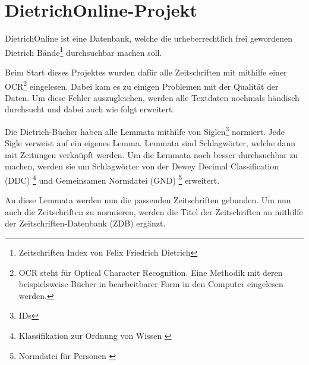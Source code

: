 \chapter{DietrichOnline-Projekt}
\label{dietrichonline}

DietrichOnline ist eine Datenbank, welche die urheberrechtlich frei gewordenen Dietrich Bände\footnote{Zeitschriften Index von Felix Friedrich Dietrich} durchsuchbar machen soll.

Beim Start dieses Projektes wurden dafür alle Zeitschriften mit mithilfe einer OCR\footnote{OCR steht für Optical Character Recognition. Eine Methodik mit deren beispielsweise Bücher in bearbeitbarer Form in den Computer eingelesen werden.} eingelesen. Dabei kam es zu einigen Problemen mit der Qualität der Daten. Um diese Fehler auszugleichen, werden alle Textdaten nochmals händisch durchsucht und dabei auch wie folgt erweitert.

Die Dietrich-Bücher haben alle Lemmata mithilfe von Siglen\footnote{IDs} normiert. Jede Sigle verweist auf ein eigenes Lemma. Lemmata sind Schlagwörter, welche dann mit Zeitungen verknüpft werden. Um die Lemmata noch besser durchsuchbar zu machen, werden sie um Schlagwörter von der Dewey Decimal Classification (DDC)  \footnote{Klassifikation zur Ordnung von Wissen \cite{DeutscheNationalBibliothek.ddc}} und Gemeinsamen Normdatei (GND)  \footnote{Normdatei für Personen \cite{DeutscheNationalBibliothek.2019b}}
erweitert.

An diese Lemmata werden nun die passenden Zeitschriften gebunden. Um nun auch die Zeitschriften zu normieren, werden die Titel der Zeitschriften an mithilfe der Zeitschriften-Datenbank (ZDB) ergänzt. 
\cite{UniversityofTrier.2016}